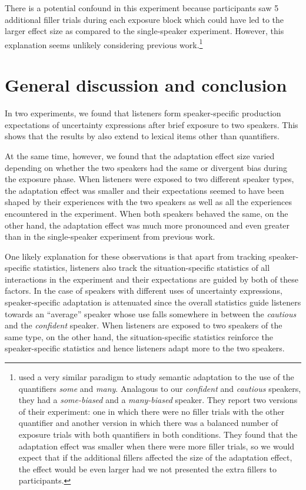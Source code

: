 There is a potential confound in this experiment because participants saw 5 additional filler trials during each exposure block which could have led to the larger effect size as compared
to the single-speaker experiment. However, this explanation seems unlikely considering previous work.\footnote{\textcite{Yildirim2016} used 
a very similar paradigm to study semantic adaptation to the use of the quantifiers \textit{some} and \textit{many}. Analagous to our \textit{confident} and 
\textit{cautious} speakers, they had a \textit{some-biased} and a \textit{many-biased} speaker. They report two versions of their experiment: one in which
there were no filler trials with the other quantifier and another version in which there was a balanced number of exposure trials with both quantifiers in both conditions. They found that the adaptation effect was smaller when there were more filler trials, so we would expect that if the additional fillers affected the size of the adaptation effect, the effect would be even larger had we not presented the extra fillers to participants.}


\section{General discussion and conclusion}

In two experiments, we found that listeners form speaker-specific production expectations of 
uncertainty expressions after brief exposure to two speakers. This shows that the results
by \textcite{Yildirim2016} also extend to lexical items other than quantifiers. 

At the same time, however, we found that the adaptation effect size varied depending on 
whether the two speakers had the same or divergent bias during the exposure phase.
When listeners were exposed to two different speaker types, the adaptation effect was smaller
and their expectations seemed to have been shaped by their experiences with the two speakers as well as all the experiences encountered in the experiment.
When both speakers behaved the same, on the other hand, the adaptation effect was much 
more pronounced and even greater than in the single-speaker experiment from previous work.

One likely explanation for these observations is that apart from tracking speaker-specific statistics,
listeners also track the situation-specific statistics of all interactions in the experiment and their expectations
are guided by both of these factors. In the case of speakers with different uses of uncertainty expressions,
speaker-specific adaptation is attenuated since the overall statistics guide listeners towards an ``average''
speaker whose use falls somewhere in between the \textit{cautious} and the \textit{confident} speaker. When listeners
are exposed to two speakers of the same type, on the other hand, the situation-specific statistics reinforce
the speaker-specific statistics and hence listeners adapt more to the two speakers. 

